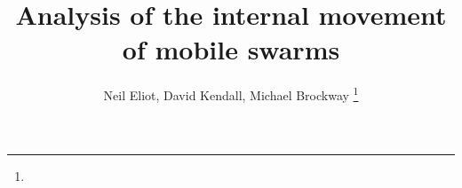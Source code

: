 \documentclass[10pt,journal,letterpaper,twoside]{IEEEtran}
\newcommand{\stability}{internal movement}
\begin{document}
%
\title{Analysis of the \stability{} of mobile swarms}
%
%
%
%

\author{Neil Eliot, David Kendall, Michael Brockway
\thanks{}}

%
%
\end{document}
